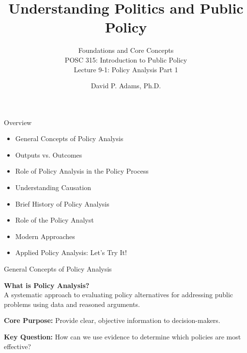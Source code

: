 \documentclass[10pt]{beamer}
\begin{document}
\title{Understanding Politics and Public Policy}
\subtitle{Foundations and Core Concepts\\POSC 315: Introduction to Public Policy\\Lecture 9-1: Policy Analysis Part 1}
\date{David P. Adams, Ph.D.}

\maketitle


\begin{frame}{Overview}

\begin{block}{}
    \begin{itemize}
        \item General Concepts of Policy Analysis
        \item Outputs vs. Outcomes
        \item Role of Policy Analysis in the Policy Process
        \item Understanding Causation
        \item Brief History of Policy Analysis
        \item Role of the Policy Analyst
        \item Modern Approaches
        \item Applied Policy Analysis: Let's Try It!
    \end{itemize}
\end{block}

\end{frame}


\begin{frame}{General Concepts of Policy Analysis}

\begin{block}{}
    \textbf{What is Policy Analysis?} \\
    A systematic approach to evaluating policy alternatives for addressing public problems using data and reasoned arguments.

    \vspace{0.8em}
    \textbf{Core Purpose:} Provide clear, objective information to decision-makers.

    \vspace{0.8em}
    \textbf{Key Question:} How can we use evidence to determine which policies are most effective?
\end{block}

\end{frame}
\end{document}
